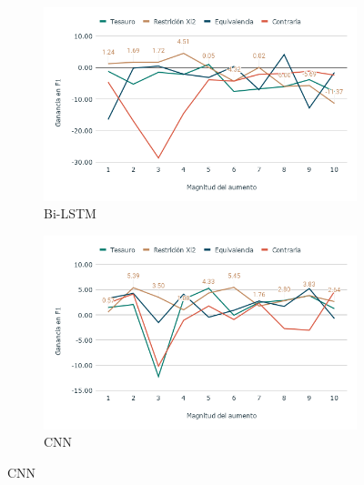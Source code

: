 \begin{figure}[hbt!]
    \begin{subfigure}[b]{0.5\textwidth}
        \includegraphics[width=\textwidth]{sections/figures/bi_LSTM2018.png}
        \caption{Bi-LSTM}
    \end{subfigure}
    \hfill
    \begin{subfigure}[b]{0.5\textwidth}
        \includegraphics[width=\textwidth]{sections/figures/CNN2018.png}
        \caption{CNN}
    \end{subfigure}
    

\end{figure}
